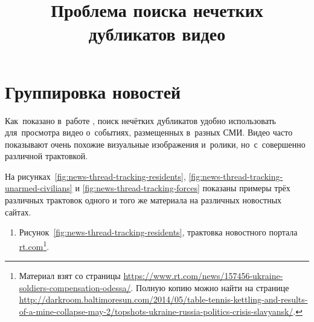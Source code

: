 \documentclass{.local/lib/classes/ndvr-super-article-standalone}
\title[NDVR thesis-abstract]{%
    Проблема поиска нечетких дубликатов видео%
}
\begin{document}
    \section{Группировка новостей}

    Как~показано в~работе \cite{Zhao:2007}, 
    поиск нечётких дубликатов удобно использовать для~просмотра
    видео о~событиях, размещенных в~разных СМИ.
    Видео часто показывают очень похожие визуальные изображения и~ролики,
    но~с~совершенно различной трактовкой.

    На рисунках~\ref{fig:news-thread-tracking-residents}, 
    \ref{fig:news-thread-tracking-unarmed-civilians} и
    \ref{fig:news-thread-tracking-forces} 
    показаны примеры трёх различных трактовок одного 
    и того же материала на различных новостных сайтах.
    \begin{enumerate}
        \item Рисунок~\ref{fig:news-thread-tracking-residents},
            трактовка новостного портала
            \href{http://rt.com}%
            {rt.com}\footnote{
                Материал взят со страницы 
                \href{https://www.rt.com/news/157456-ukraine-soldiers-compensation-odessa/}%
                {https://www.rt.com/news/157456-ukraine-soldiers-compensation-odessa/}.
                Полную копию можно найти на странице
                \href{http://darkroom.baltimoresun.com/2014/05/table-tennis-kettling-and-results-of-a-mine-collapse-may-2/topshots-ukraine-russia-politics-crisis-slavyansk/}%
                {http://darkroom.baltimoresun.com/2014/05/table-tennis-kettling-and-results-of-a-mine-collapse-may-2/topshots-ukraine-russia-politics-crisis-slavyansk/}.
            }.
\end{enumerate}
\end{document}
